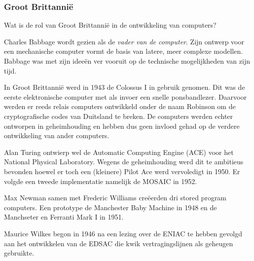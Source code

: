 \documentclass[../main.tex]{subfiles}
\begin{document}
\subsubsection{Groot Brittanni\"e}
\begin{question}
Wat is de rol van Groot Brittanni\"e in de ontwikkeling van computers?
\end{question}
\begin{solution}
Charles Babbage wordt gezien als de \emph{vader van de computer}. Zijn ontwerp voor een mechanische computer vormt de basis van latere, meer complexe modellen. Babbage was met zijn idee\"en ver vooruit op de technische mogelijkheden van
zijn tijd.

In Groot Brittanni\"e werd in 1943 de Colossus I in gebruik genomen. Dit was de eerste elektronische computer met als invoer een snelle ponsbandlezer.
Daarvoor werden er reeds relais computers ontwikkeld onder de naam Robinson om de cryptografische codes van Duitsland te breken.
De computers werden echter ontworpen in geheimhouding en hebben dus geen invloed gehad op de verdere ontwikkeling van ander computers.

Alan Turing ontwierp wel de Automatic Computing Engine (ACE) voor het National Physical Laboratory.
Wegens de geheimhouding werd dit te ambitieus bevonden hoewel er toch een (kleinere) Pilot Ace werd vervoledigt in 1950.
Er volgde een tweede implementatie namelijk de MOSAIC in 1952.

Max Newman samen met Frederic Williams cre\"eerden dri stored program computers.
Een prototype de Manchester Baby Machine in 1948 en de Manchseter en Ferranti Mark I in 1951.

Maurice Wilkes  begon in 1946 na een lezing over de ENIAC te hebben gevolgd aan het ontwikkelen van de EDSAC die kwik vertragingslijnen als geheugen gebruikte.
\end{solution}
\end{document}
